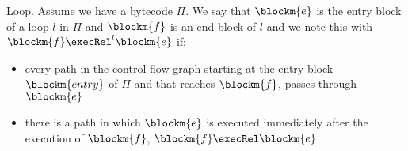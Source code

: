 

\begin{definition}
{Loop.}
\label{defLoop}
Assume we have a bytecode $\Pi$. We say that $\blockm{e}$ is the entry block of a loop $l$ in $\Pi$ and $\blockm{f}$ is an end block of $l$ and we note this with  
 $\blockm{f} \execRel^l \blockm{e}$ if:
\begin{itemize}
\item every path in the control flow graph starting at the entry block $\blockm{entry}$ of $\Pi$ and that reaches $\blockm{f}$, passes through  $\blockm{e}$ 
\item   there is a path in which $\blockm{e}$  is executed immediately after the execution of $\blockm{f}$,  $\blockm{f} \execRel \blockm{e}$

\end{itemize}
\end{definition}


